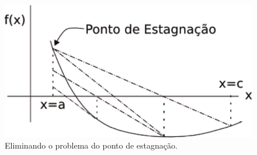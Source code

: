 \begin{figure}[htb]
  \setlength{\abovecaptionskip}{20pt}
  \centering
  \includegraphics[scale=0.8]{capitulos/capitulo1/figuras/posicaofalsamodificado1-eps-converted-to.pdf}
  \caption{Eliminando o problema do ponto de estagnação.}
  \label{fig:posicaofalsamodificado1}
\end{figure}

